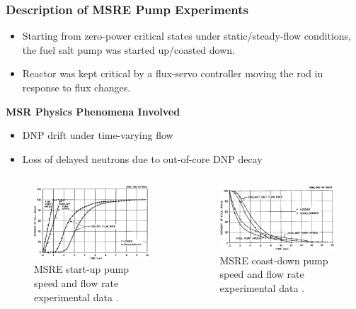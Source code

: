 \begin{frame}
  \frametitle{Description of MSRE Pump Experiments}
  \begin{itemize}
    \item Starting from zero-power critical states under static/steady-flow conditions, the fuel salt pump
  was started up/coasted down.
    \item Reactor was kept critical by a flux-servo controller moving the rod in response to flux
      changes.
  \end{itemize}
  \begin{block}{\textbf{MSR Physics Phenomena Involved}}
    \begin{itemize}
      \item DNP drift under time-varying flow
      \item Loss of delayed neutrons due to out-of-core DNP decay
    \end{itemize}
  \end{block}
  \begin{columns}
    \column{5.5cm}
    \begin{figure}
      \centering
      \includegraphics[width=.8\columnwidth]{images/msre-startup}
      \caption{MSRE start-up pump speed and flow rate experimental data
      \cite{prince_zero-power_1968}.}
    \end{figure}
    \column{5.5cm}
    \begin{figure}
      \centering
      \includegraphics[width=.95\columnwidth]{images/msre-coastdown}
      \caption{MSRE coast-down pump speed and flow rate experimental data
      \cite{prince_zero-power_1968}.}
    \end{figure}
  \end{columns}
\end{frame}

